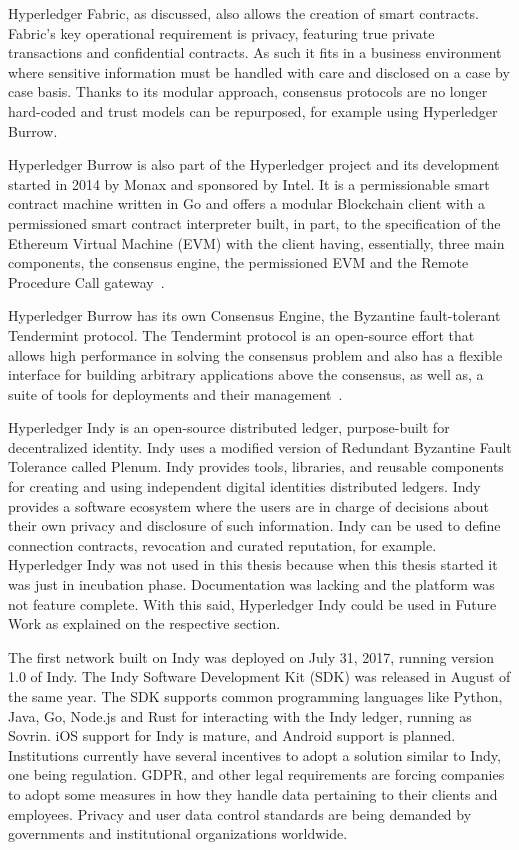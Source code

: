 Hyperledger Fabric, as discussed, also allows the creation of smart contracts.
Fabric's key operational requirement is privacy, featuring true private
transactions and confidential contracts. As such it fits in a business
environment where sensitive information must be handled with care and disclosed
on a case by case basis. Thanks to its modular approach, consensus protocols
are no longer hard-coded and trust models can be repurposed, for example using
Hyperledger Burrow.

Hyperledger Burrow is also part of the Hyperledger project and its development
started in 2014 by Monax and sponsored by Intel. It is a permissionable smart
contract machine written in Go and offers a modular Blockchain client with a
permissioned smart contract interpreter built, in part, to the specification of
the Ethereum Virtual Machine (EVM) with the client having, essentially, three
main components, the consensus engine, the permissioned EVM and the Remote
Procedure Call gateway~\cite{Kuhlman2017,HyperledgerBurrow2017}.

Hyperledger Burrow has its own Consensus Engine, the Byzantine fault-tolerant
Tendermint protocol.  The Tendermint protocol is an open-source effort that
allows high performance in solving the consensus problem and also has a
flexible interface for building arbitrary applications above the consensus, as
well as, a suite of tools for deployments and their
management~\cite{Buchman2016}.

Hyperledger Indy is an open-source distributed ledger, purpose-built for
decentralized identity. Indy uses a modified version of Redundant Byzantine
Fault Tolerance called Plenum. Indy provides tools, libraries, and reusable
components for creating and using independent digital identities distributed
ledgers. Indy provides a software ecosystem where the users are in charge of
decisions about their own privacy and disclosure of such information.  Indy can
be used to define connection contracts, revocation and curated reputation, for
example. Hyperledger Indy was not used in this thesis because when this thesis
started it was just in incubation phase. Documentation was lacking and the
platform was not feature complete. With this said, Hyperledger Indy could be
used in Future Work as explained on the respective section.

The first network built on Indy was deployed on July 31, 2017, running version
1.0 of Indy. The Indy Software Development Kit (SDK) was released in August of
the same year. The SDK supports common programming languages like Python, Java,
Go, Node.js and Rust for interacting with the Indy ledger, running as Sovrin.
iOS support for Indy is mature, and Android support is planned. Institutions
currently have several incentives to adopt a solution similar to Indy, one
being regulation. GDPR, and other legal requirements are forcing companies to
adopt some measures in how they handle data pertaining to their clients and
employees. Privacy and user data control standards are being demanded by
governments and institutional organizations worldwide.
